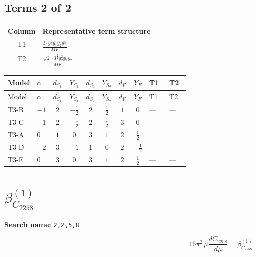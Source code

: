 \documentclass[8pt]{article}
\begin{document}
\begin{landscape}
\subsection*{Terms 2 of 2}
\begin{center}
\begin{tabular}{@{}c >{\raggedright\arraybackslash}p{0.82\linewidth}@{}}
\toprule
Column & Representative term structure \\
\midrule
T1 & \(\displaystyle \frac{3^{\frac{3}{4}} ye \overline{y_{1}} \overline{y_{2}} \overline{ye}}{MF}\) \\
\midrule
T2 & \(\displaystyle \frac{\sqrt{2} \cdot 3^{\frac{3}{4}} g_{2}^{2} \overline{y_{1}} \overline{y_{2}}}{MF}\) \\
\midrule
\bottomrule
\end{tabular}
\end{center}
\smallskip
\tiny
\begin{longtable}{@{}llcccccc >{\raggedright\arraybackslash}p{0.21\linewidth} >{\raggedright\arraybackslash}p{0.21\linewidth}@{}}
\toprule
Model & $\alpha$ & $d_{S_1}$ & $Y_{S_1}$ & $d_{S_2}$ & $Y_{S_2}$ & $d_F$ & $Y_F$ & T1 & T2 \\
\midrule
\endfirsthead
\toprule
Model & $\alpha$ & $d_{S_1}$ & $Y_{S_1}$ & $d_{S_2}$ & $Y_{S_2}$ & $d_F$ & $Y_F$ & T1 & T2 \\
\midrule
\endhead
T3-B & $-1$ & $2$ & $-\frac{1}{2}$ & $2$ & $\frac{1}{2}$ & $1$ & $0$ & --- & --- \\
\midrule
T3-C & $-1$ & $2$ & $-\frac{1}{2}$ & $2$ & $\frac{1}{2}$ & $3$ & $0$ & --- & --- \\
\midrule
T3-A & $0$ & $1$ & $0$ & $3$ & $1$ & $2$ & $\frac{1}{2}$ & \scriptsize\adjustbox{max width=\linewidth}{$\begin{gathered} - \frac{3^{\frac{3}{4}} ye \overline{y_{1}} \overline{y_{2}} \overline{ye}}{12 MF}\end{gathered}$} & \scriptsize\adjustbox{max width=\linewidth}{$\begin{gathered} \frac{\sqrt{2} \cdot 3^{\frac{3}{4}} g_{2}^{2} \overline{y_{1}} \overline{y_{2}}}{3 MF}\end{gathered}$} \\
\midrule
T3-D & $-2$ & $3$ & $-1$ & $1$ & $0$ & $2$ & $-\frac{1}{2}$ & --- & --- \\
\midrule
T3-E & $0$ & $3$ & $0$ & $3$ & $1$ & $2$ & $\frac{1}{2}$ & --- & --- \\
\midrule
\bottomrule
\end{longtable}
\clearpage
\section*{$\beta_{C_{2258}}^{(1)}$}
\noindent\textbf{Search name: }\texttt{2,2,5,8}\par\smallskip
\[16\pi^2\,\mu\frac{d C_{2258}}{d\mu}=\beta_{C_{2258}}^{(1)}\]

\end{landscape}
\end{document}
